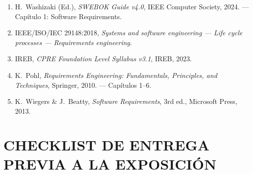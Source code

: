 \documentclass[11pt,a4paper]{article}
\begin{document}
	\begin{enumerate}[leftmargin=18pt, itemsep=3pt]
		\item H.~Washizaki (Ed.), \textit{SWEBOK Guide v4.0}, IEEE Computer Society, 2024. — Capítulo 1: Software Requirements.
		\item IEEE/ISO/IEC 29148:2018, \textit{Systems and software engineering --- Life cycle processes --- Requirements engineering}.
		\item IREB, \textit{CPRE Foundation Level Syllabus v3.1}, IREB, 2023.
		\item K.~Pohl, \textit{Requirements Engineering: Fundamentals, Principles, and Techniques}, Springer, 2010. — Capítulos 1--6.
		\item K.~Wiegers \& J.~Beatty, \textit{Software Requirements}, 3rd ed., Microsoft Press, 2013.
	\end{enumerate}
	
	\section{CHECKLIST DE ENTREGA PREVIA A LA EXPOSICIÓN}
	
\end{document}
